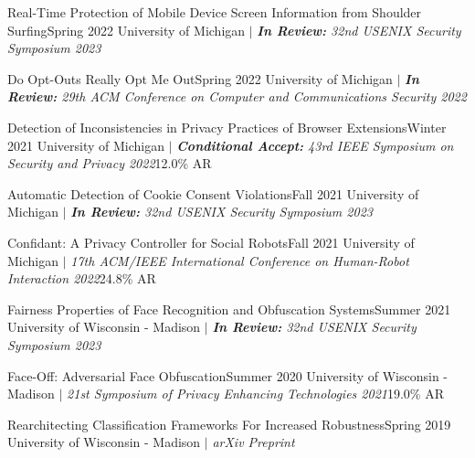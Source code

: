 
    \CVSubheading
      {{Real-Time Protection of Mobile Device Screen Information from Shoulder Surfing}\cite{ShoulderSurfing}}{Spring 2022}
      {{University of Michigan} $|$ \emph{\small{\textbf{In Review:} 32nd USENIX Security Symposium 2023}}}{}

    \CVSubheading
      {{Do Opt-Outs Really Opt Me Out}\cite{OptOutChk}}{Spring 2022}
      {{University of Michigan} $|$ \emph{\small{\textbf{In Review:} 29th ACM Conference on Computer and Communications Security 2022}}}{}

    \CVSubheading
      {{Detection of Inconsistencies in Privacy Practices of Browser Extensions}\cite{BrowserExtensions}}{Winter 2021}
      {{University of Michigan} $|$ \emph{\small{\textbf{Conditional Accept:} 43rd IEEE Symposium on Security and Privacy 2022}}}{12.0\% AR}

    \CVSubheading
      {{Automatic Detection of Cookie Consent Violations}\cite{ConsentChk}}{Fall 2021}
      {{University of Michigan} $|$ \emph{\small{\textbf{In Review:} 32nd USENIX Security Symposium 2023}}}{}

    \CVSubheading
      {{Confidant: A Privacy Controller for Social Robots}\cite{HRIPrivacy}}{Fall 2021}
      {{University of Michigan} $|$ \emph{\small{17th ACM/IEEE International Conference on Human-Robot Interaction 2022}}}{24.8\% AR}
      
      
      
    \CVSubheading
      {{Fairness Properties of Face Recognition and Obfuscation Systems}\cite{Fairness}}{Summer 2021}
      {{University of Wisconsin - Madison} $|$ \emph{\small{\textbf{In Review:} 32nd USENIX Security Symposium 2023}}}{}

    \CVSubheading
      {{Face-Off: Adversarial Face Obfuscation}\cite{FaceOff}}{Summer 2020}
      {{University of Wisconsin - Madison} $|$ \emph{\small{21st Symposium of Privacy Enhancing Technologies 2021}}}{19.0\% AR}


    \CVSubheading
      {{Rearchitecting Classification Frameworks For Increased Robustness}\cite{Robustness}}{Spring 2019}
      {{University of Wisconsin - Madison} $|$ \emph{\small{arXiv Preprint}}}{}

  \CVSubHeadingListEnd